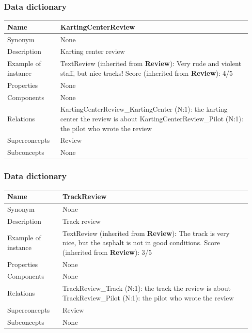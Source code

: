 \documentclass{beamer}
\begin{document}
\begin{frame}
    \frametitle{Data dictionary}
    \begin{table}
    \tiny
    \begin{tabular}{|p{2cm}|p{6cm}|}
    \hline
    Name & \textbf{KartingCenterReview} \\
    \hline
    Synonym & None \\
    \hline
    Description & Karting center review \\
    \hline
    Example of instance &
    TextReview (inherited from \textbf{Review}): Very rude and violent staff, but nice tracks! \newline
    Score (inherited from \textbf{Review}): 4/5 \\
    \hline
    Properties & None \\
    \hline
    Components & None \\
    \hline
    Relations &
    KartingCenterReview\_KartingCenter (N:1): the karting center the review is about \newline
    KartingCenterReview\_Pilot (N:1): the pilot who wrote the review \\
    \hline
    Superconcepts & Review \\
    \hline
    Subconcepts & None \\
    \hline
    \end{tabular}
    \end{table}
\end{frame}

\begin{frame}
    \frametitle{Data dictionary}
    \begin{table}
    \tiny
    \begin{tabular}{|p{2cm}|p{6cm}|}
    \hline
    Name & \textbf{TrackReview} \\
    \hline
    Synonym & None \\
    \hline
    Description & Track review \\
    \hline
    Example of instance &
    TextReview (inherited from \textbf{Review}): The track is very nice, but the asphalt is not in good conditions. \newline
    Score (inherited from \textbf{Review}): 3/5 \\
    \hline
    Properties & None \\
    \hline
    Components & None \\
    \hline
    Relations &
    TrackReview\_Track (N:1): the track the review is about \newline
    TrackReview\_Pilot (N:1): the pilot who wrote the review \\
    \hline
    Superconcepts & Review \\
    \hline
    Subconcepts & None \\
    \hline
    \end{tabular}
    \end{table}
\end{frame}
\end{document}
